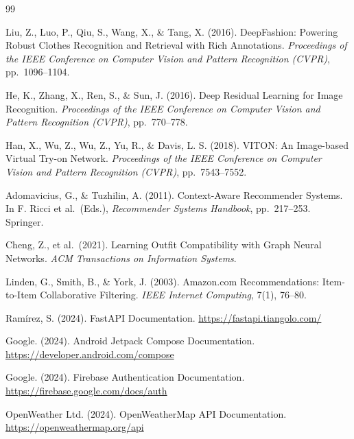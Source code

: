 \documentclass[12pt,a4paper]{report}
\begin{document}
\begin{thebibliography}{99}

Liu, Z., Luo, P., Qiu, S., Wang, X., \& Tang, X. (2016).
DeepFashion: Powering Robust Clothes Recognition and Retrieval with Rich Annotations.
\textit{Proceedings of the IEEE Conference on Computer Vision and Pattern Recognition (CVPR)}, pp.\ 1096--1104.

He, K., Zhang, X., Ren, S., \& Sun, J. (2016).
Deep Residual Learning for Image Recognition.
\textit{Proceedings of the IEEE Conference on Computer Vision and Pattern Recognition (CVPR)}, pp.\ 770--778.

Han, X., Wu, Z., Wu, Z., Yu, R., \& Davis, L. S. (2018).
VITON: An Image-based Virtual Try-on Network.
\textit{Proceedings of the IEEE Conference on Computer Vision and Pattern Recognition (CVPR)}, pp.\ 7543--7552.

Adomavicius, G., \& Tuzhilin, A. (2011).
Context-Aware Recommender Systems.
In F. Ricci et al.\ (Eds.), \textit{Recommender Systems Handbook}, pp.\ 217--253. Springer.

Cheng, Z., et al.\ (2021).
Learning Outfit Compatibility with Graph Neural Networks.
\textit{ACM Transactions on Information Systems}.

Linden, G., Smith, B., \& York, J. (2003).
Amazon.com Recommendations: Item-to-Item Collaborative Filtering.
\textit{IEEE Internet Computing}, 7(1), 76--80.

Ramírez, S. (2024). FastAPI Documentation. \url{https://fastapi.tiangolo.com/}

Google. (2024). Android Jetpack Compose Documentation. \url{https://developer.android.com/compose}

Google. (2024). Firebase Authentication Documentation. \url{https://firebase.google.com/docs/auth}

OpenWeather Ltd. (2024). OpenWeatherMap API Documentation. \url{https://openweathermap.org/api}

\end{thebibliography}

\appendix
\end{document}
